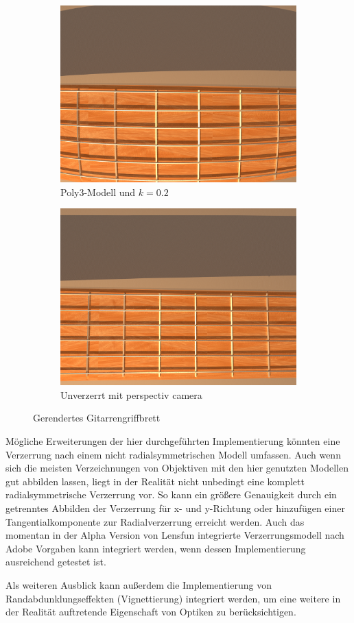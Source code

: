 \begin{figure}[h]
	\begin{subfigure}{.5\textwidth}
		\raggedleft
		\includegraphics[width=\textwidth]{img/guitarDistorted.png}
		\caption{Poly3-Modell und $k=0.2$}
	\end{subfigure}
\begin{subfigure}{.5\textwidth}
		\raggedright
		\includegraphics[width=\textwidth, ]{img/guitarUndist.png}
		\caption{Unverzerrt mit perspectiv camera}
	\end{subfigure}
\caption{Gerendertes Gitarrengriffbrett}
\label{fig:Guitar}
\end{figure}

Mögliche Erweiterungen der hier durchgeführten Implementierung könnten eine Verzerrung nach einem nicht radialsymmetrischen Modell umfassen. Auch wenn sich die meisten Verzeichnungen von Objektiven mit den hier genutzten Modellen gut abbilden lassen, liegt in der Realität nicht unbedingt eine komplett radialsymmetrische Verzerrung vor. So kann ein größere Genauigkeit durch ein getrenntes Abbilden der Verzerrung für x- und y-Richtung oder hinzufügen einer Tangentialkomponente zur Radialverzerrung erreicht werden. Auch das momentan in der Alpha Version von Lensfun integrierte Verzerrungsmodell nach Adobe Vorgaben kann integriert werden, wenn dessen Implementierung ausreichend getestet ist. 

Als weiteren Ausblick kann außerdem die Implementierung von Randabdunklungseffekten (Vignettierung) integriert werden, um eine weitere in der Realität auftretende Eigenschaft von Optiken zu berücksichtigen. 
